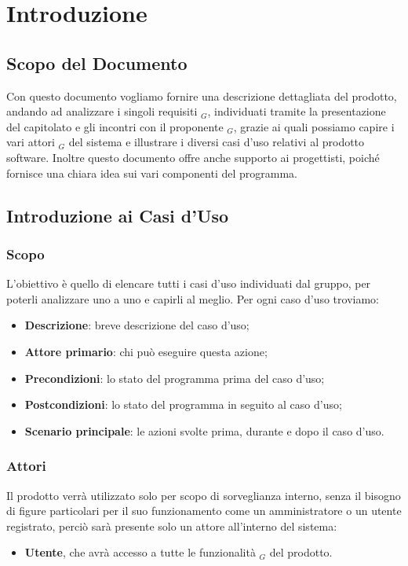 \chapter{Introduzione}

\section{Scopo del Documento}
Con questo documento vogliamo fornire una descrizione dettagliata del prodotto, andando ad analizzare i singoli
requisiti $_G$, individuati tramite la presentazione del capitolato e gli incontri con il proponente $_G$, grazie ai quali
possiamo capire i vari attori $_G$ del sistema e illustrare i diversi casi d'uso relativi al prodotto software.
\newline
Inoltre questo documento offre anche supporto ai progettisti, poiché fornisce una chiara idea sui vari componenti del programma.

\section{Introduzione ai Casi d'Uso}
\subsection{Scopo}
L'obiettivo è quello di elencare tutti i casi d'uso individuati dal gruppo, per poterli analizzare uno a uno e capirli al meglio.
\newline
Per ogni caso d'uso troviamo:
\begin{itemize}
  \item \textbf{Descrizione}: breve descrizione del caso d'uso;
  \item \textbf{Attore primario}: chi può eseguire questa azione;
  \item \textbf{Precondizioni}: lo stato del programma prima del caso d'uso;
  \item \textbf{Postcondizioni}: lo stato del programma in seguito al caso d'uso;
  \item \textbf{Scenario principale}: le azioni svolte prima, durante e dopo il caso d'uso.
\end{itemize}

\subsection{Attori}
Il prodotto verrà utilizzato solo per scopo di sorveglianza interno, senza il bisogno di figure particolari per il suo funzionamento
come un amministratore o un utente registrato, perciò sarà presente solo un attore all'interno del sistema:
\begin{itemize}
  \item \textbf{Utente}, che avrà accesso a tutte le funzionalità $_G$ del prodotto.
\end{itemize}

